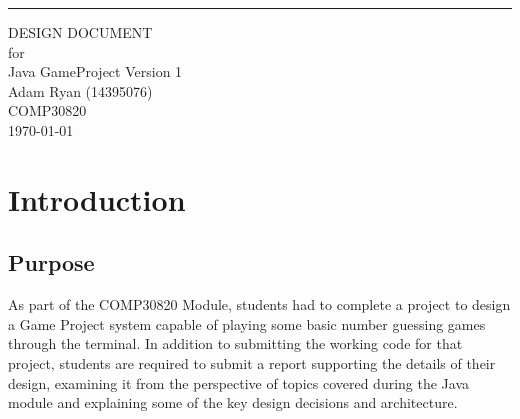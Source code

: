 \documentclass{scrreprt}
\date{}
\def\myversion{1 }
\begin{document}
\begin{flushright}
    \rule{16cm}{5pt}\vskip1cm
    \begin{bfseries}
        \Huge{DESIGN DOCUMENT\\}
        \vspace{1.9cm}
        for\\
        \vspace{1.9cm}
        Java GameProject
        \vspace{1.9cm}
        \LARGE{Version \myversion}\\
        \vspace{1.9cm}
        Adam Ryan (14395076)\\
        \vspace{1.9cm}
        COMP30820\\
        \vspace{1.9cm}
        \today\\
    \end{bfseries}
\end{flushright}

\tableofcontents

\chapter{Introduction}\label{Intro}

\section{Purpose}\label{Purpose}
As part of the COMP30820 Module, students had to complete a project to design a Game Project system capable of playing some basic number guessing games through the terminal. In addition to submitting the working code for that project, students are required to submit a report supporting the details of their design, examining it from the perspective of topics covered during the Java module and explaining some of the key design decisions and architecture.
\end{document}
